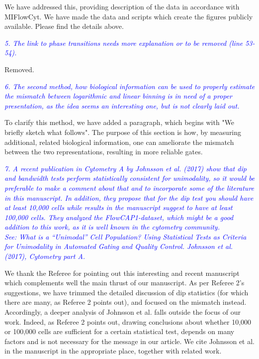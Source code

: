 \documentclass[letter,11pt,draft]{article}
\newcommand{\re}[1]{\emph{\textcolor{blue}{#1}}}
\begin{document}
\smallskip
We have addressed this, providing description of the data in accordance with MIFlowCyt. We have made the data and scripts which create the figures publicly available. Please find the details above.

\smallskip
\re{5. The link to phase transitions needs more explanation or to be removed (line 53-54).}

\smallskip
Removed.

\re{6. The second method, how biological information can be used to properly estimate the mismatch between logarithmic and linear binning is in need of a proper presentation, as the idea seems an interesting one, but is not clearly laid out.}

\smallskip
To clarify this method, we have added a paragraph, which begins with "We briefly sketch what follows". The purpose of this section is how, by measuring additional, related biological information, one can ameliorate the mismatch between the two representations, resulting in more reliable gates. 

\re{7. A recent publication in Cytometry A by Johnsson et al. (2017) show that dip and bandwidth tests perform statistically consistent for unimodality, so it would be preferable to make a comment about that and to incorporate some of the literature in this manuscript. In addition, they propose that for the dip test you should have at least 10,000 cells while results in the manuscript suggest to have at least 100,000 cells. They analyzed the FlowCAP1-dataset, which might be a good addition to this work, as it is well known in the cytometry community.}
\\ 
\re{See: What is a “Unimodal” Cell Population? Using Statistical Tests as Criteria for Unimodality in Automated Gating and Quality Control. Johnsson et al. (2017), Cytometry part A.}

\smallskip
We thank the Referee for pointing out this interesting and recent manuscript which complements well the main thrust of our manuscript. As per Referee 2's suggestions, we have trimmed the detailed discussion of dip statistics (for which there are many, as Referee 2 points out), and focused on the mismatch instead. Accordingly, a deeper analysis of Johnsson et al. falls outside the focus of our work. Indeed, as Referee 2 points out, drawing conclusions about whether 10,000 or 100,000 cells are sufficient for a certain statistical test, depends on many factors and is not necessary for the message in our article. We cite Johnsson et al. in the manuscript in the appropriate place, together with related work. 
\end{document}
